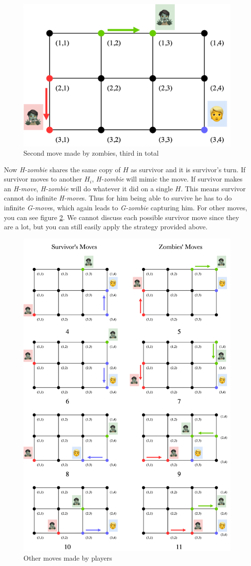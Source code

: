 \documentclass[1p]{elsarticle}
\begin{document}
\begin{figure}[h!]
	\centering
	\includegraphics[width=0.5\linewidth]{fig/p34m3.png}
	\caption{Second move made by zombies, third in total}
	\label{fig:p5}
\end{figure}

Now {\it H-zombie} shares the same copy of $H$ as survivor and it is survivor's turn. If survivor moves to another $H_i$,
{\it H-zombie} will mimic the move. If survivor makes an {\it H-move}, {\it H-zombie} will do whatever it did on a
single $H$. This means survivor cannot do infinite {\it H-move}s. Thus for him being able to survive he has to do
infinite {\it G-move}s, which again leads to {\it G-zombie} capturing him. For other moves, you can see
figure \ref{fig:p6}. We cannot discuss each possible survivor move since they are a lot, but you can still easily apply
the strategy provided above. 

\begin{figure}[h!]
	\centering
	\includegraphics[width=1\linewidth]{fig/p34m6.png}
	\caption{Other moves made by players}
	\label{fig:p6}
\end{figure}

	
\end{document}
